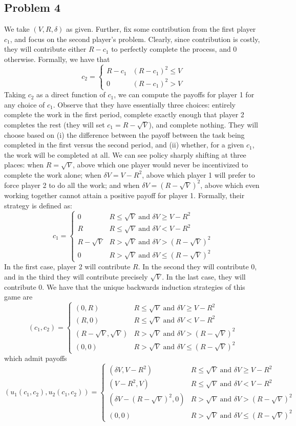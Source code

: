 \documentclass[10pt]{article}
\begin{document}
\subsection*{Problem 4}

We take $(V,R,\delta)$ as given. Further, fix some contribution from the first player $c_1$, and focus on the second player's problem. Clearly, since contribution is costly, they will contribute either $R-c_1$ to perfectly complete the process, and 0 otherwise. Formally, we have that\[c_2 = \begin{cases} R - c_1 & (R-c_1)^2 \le V \\ 0 & (R-c_1)^2 > V \end{cases}\]Taking $c_2$ as a direct function of $c_1$, we can compute the payoffs for player 1 for any choice of $c_1$. Observe that they have essentially three choices: entirely complete the work in the first period, complete exactly enough that player 2 completes the rest (\ie they will set $c_1 = R - \sqrt{V}$), and complete nothing. They will choose based on (i) the difference between the payoff between the task being completed in the first versus the second period, and (ii) whether, for a given $c_1$, the work will be completed at all. We can see policy sharply shifting at three places: when $R = \sqrt{V}$, above which one player would never be incentivized to complete the work alone; when $\delta V = V - R^2$, above which player 1 will prefer to force player 2 to do all the work; and when $\delta V = (R-\sqrt{V})^2$, above which even working together cannot attain a positive payoff for player 1. Formally, their strategy is defined as: \[c_1 = \begin{cases} 0 & R \le \sqrt{V} \text{ and } \delta V \ge V - R^2 \\ R & R \le \sqrt{V} \text{ and } \delta V < V - R^2 \\ R - \sqrt{V} & R > \sqrt{V} \text{ and } \delta V > (R-\sqrt{V})^2 \\ 0 & R > \sqrt{V} \text{ and } \delta V \le (R - \sqrt{V})^2 \end{cases} \]In the first case, player 2 will contribute $R$. In the second they will contribute 0, and in the third they will contribute precisely $\sqrt{V}$. In the last case, they will contribute 0. We have that the unique backwards induction strategies of this game are \[(c_1,c_2) =  \begin{cases} (0,R) & R \le \sqrt{V} \text{ and } \delta V \ge V - R^2 \\ (R,0) & R \le \sqrt{V} \text{ and } \delta V < V - R^2 \\ (R - \sqrt{V},\sqrt{V}) & R > \sqrt{V} \text{ and } \delta V > (R-\sqrt{V})^2 \\ (0,0) & R > \sqrt{V} \text{ and } \delta V \le (R - \sqrt{V})^2 \end{cases}\]which admit payoffs \[(u_1(c_1,c_2),u_2(c_1,c_2)) =\begin{cases} (\delta V, V - R^2) & R \le \sqrt{V} \text{ and } \delta V \ge V - R^2 \\ (V - R^2, V) & R \le \sqrt{V} \text{ and } \delta V < V - R^2 \\(\delta V - (R-\sqrt{V})^2, 0) & R > \sqrt{V} \text{ and } \delta V > (R-\sqrt{V})^2 \\ (0,0) & R > \sqrt{V} \text{ and } \delta V \le (R - \sqrt{V})^2 \end{cases}\]
\end{document}
